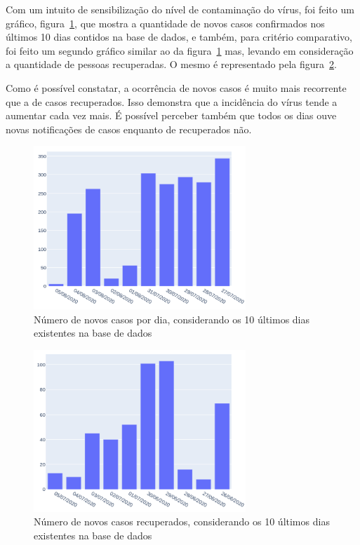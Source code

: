 Com um intuito de sensibilização do nível de contaminação do vírus, foi feito um gráfico, figura~\ref{fig:uc5}, que mostra a quantidade de novos casos confirmados nos últimos 10 dias contidos na base de dados, e também, para critério comparativo, foi feito um segundo gráfico similar ao da figura~\ref{fig:uc5} mas, levando em consideração a quantidade de pessoas recuperadas. O mesmo é representado pela figura~\ref{fig:uc6}. 

Como é possível constatar, a ocorrência de novos casos é muito mais recorrente que a de casos recuperados. Isso demonstra que a incidência do vírus tende a aumentar cada vez mais. É possível perceber também que todos os dias ouve novas notificações de casos enquanto de recuperados não.
\begin{figure}[!ht]
\centering
    \includegraphics[width=8cm]{img/ultimos10dias.png}
    \caption{Número de novos casos por dia, considerando os 10 últimos dias existentes na base de dados}
    \label{fig:uc5} %
\end{figure}
\begin{figure}[!ht]
\centering
    \includegraphics[width=8cm]{img/ultimos10diasConfirmados.png}
    \caption{Número de novos casos recuperados, considerando os 10 últimos dias existentes na base de dados}
    \label{fig:uc6} %
\end{figure}

